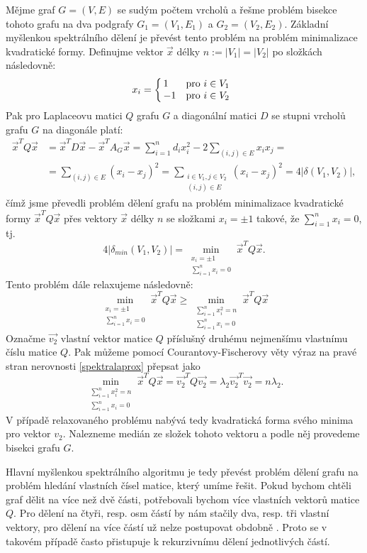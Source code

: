 \documentclass[11pt,american,czech,oneside]{book}
\theoremstyle{plain}
\theoremstyle{definition}
\begin{document}
Mějme graf $G=(V,E)$ se sudým počtem vrcholů a řešme problém bisekce tohoto grafu na dva podgrafy $G_1=(V_1,E_1)$ a $G_2=(V_2,E_2)$. Základní myšlenkou spektrálního dělení je převést tento problém na problém minimalizace kvadratické formy.
Definujme vektor $\vec{x}$ délky $n:=|V_1|=|V_2|$ po složkách následovně:
\[
x_i =
\left\{
	\begin{array}{@{\,}ll}
		1  & \mbox{pro } i \in V_1 \\
		-1 & \mbox{pro } i \in V_2
	\end{array}
\right.
\]
Pak pro Laplaceovu matici $Q$ grafu $G$ a diagonální matici $D$ se stupni vrcholů grafu $G$ na diagonále platí:
\begin{align*}
  \vec{x}^T Q \vec{x} &= \vec{x}^T D \vec{x} - \vec{x}^T A_G \vec{x} = \sum_{i=1}^{n}d_i x_i^2 - 2 \sum_{(i,j)\in E} x_i x_j = \\
&=\sum_{(i,j)\in E}(x_i-x_j)^2 =
\sum\limits_{\substack{i \in V_1, j \in V_2 \\ (i,j)\in E}}(x_i-x_j)^2 =
4|\delta(V_1, V_2)|,
\end{align*}
\noindent
čímž jsme převedli problém dělení grafu na problém minimalizace kvadratické formy $\vec{x}^T Q \vec{x}$ přes vektory $\vec{x}$ délky $n$ se složkami $x_i = \pm 1$ takové, že $\sum_{i=1 }^{n}x_i = 0$, tj.
\[
  4 |\delta_{min}(V_1, V_2)| = \min_{\substack{x_i = \pm 1 \\ \sum_{i=1 }^{n}x_i = 0}} \vec{x}^T Q \vec{x}.
  \]
Tento problém dále relaxujeme následovně:
\begin{equation}\label{spektralaprox}
\min_{\substack{x_i = \pm 1 \\ \sum_{i=1 }^{n}x_i = 0}} \vec{x}^T Q \vec{x} \geq \min_{\substack{\sum_{i=1}^{n}x_i^2 = n \\ \sum_{i=1 }^{n}x_i = 0}} \vec{x}^T Q \vec{x}
\end{equation}
Označme $\vec{v_2}$ vlastní vektor matice $Q$ příslušný druhému nejmenšímu vlastnímu číslu matice $Q$. Pak můžeme pomocí Courantovy-Fischerovy věty \cite{hojo:85} výraz na pravé stran nerovnosti \ref{spektralaprox} přepsat jako
\[
\min_{\substack{\sum_{i=1}^{n}x_i^2 = n \\ \sum_{i=1 }^{n}x_i = 0}} \vec{x}^T Q \vec{x} = \vec{v_2}^T Q \vec{v_2} = \lambda_2 \vec{v_2}^T \vec{v_2} = n \lambda_2.
\]
V případě relaxovaného problému nabývá tedy kvadratická forma svého minima pro vektor $v_2$. Nalezneme medián ze složek tohoto vektoru a podle něj provedeme bisekci grafu $G$.

Hlavní myšlenkou spektrálního algoritmu je tedy převést problém dělení grafu na problém hledání vlastních čísel matice, který umíme řešit. Pokud bychom chtěli graf dělit na více než dvě části, potřebovali bychom více vlastních vektorů matice $Q$. Pro dělení na čtyři, resp. osm částí by nám stačily dva, resp. tři vlastní vektory, pro dělení na více částí už nelze postupovat obdobně \cite{lehe:94}. Proto se v takovém případě často přistupuje k rekurzivnímu dělení jednotlivých částí.
\end{document}
